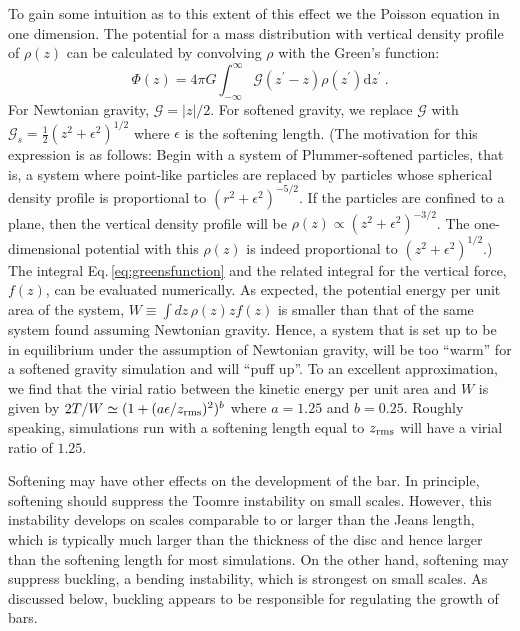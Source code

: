 To gain some intuition as to this extent of
this effect we the Poisson equation in one dimension.  The potential
for a mass distribution with vertical density profile of $\rho(z)$ can
be calculated by convolving $\rho$ with the Green's function:
\begin{equation}\label{eq:greensfunction}
\Phi(z)= 4\pi G\int_{-\infty}^{\infty} \mathcal{G}(z^\prime - z)
\rho(z^\prime) \text{d} z^\prime~.
\end{equation}
For Newtonian gravity, $\mathcal{G} = |z|/2$.  For softened gravity,
we replace $\mathcal{G}$ with $\mathcal{G}_s = \frac{1}{2}\left (z^2 +
\epsilon^2\right )^{1/2}$ where $\epsilon$ is the softening length.
(The motivation for this expression is as follows: Begin with a system
of Plummer-softened particles, that is, a system where point-like
particles are replaced by particles whose spherical density profile is
proportional to $\left (r^2 + \epsilon^2\right )^{-5/2}$.  If the
particles are confined to a plane, then the vertical density profile
will be $\rho(z)\propto \left (z^2 + \epsilon^2\right )^{-3/2}$.  The
one-dimensional potential with this $\rho(z)$ is indeed proportional
to $\left (z^2 + \epsilon^2\right )^{1/2}$.)  The integral
Eq.\,\ref{eq:greensfunction} and the related integral for the vertical
force, $f(z)$, can be evaluated numerically.  As expected, the
potential energy per unit area of the system, $W \equiv \int
dz\,\rho(z) z f(z)$ is smaller than that of the same system found
assuming Newtonian gravity.  Hence, a system that is set up to be in
equilibrium under the assumption of Newtonian gravity, will be too
``warm'' for a softened gravity simulation and will ``puff up''.  To
an excellent approximation, we find that the virial ratio between the
kinetic energy per unit area and $W$ is given by $2T/W \simeq (1 +
(a\epsilon/z_{\rm rms})^2)^{b}$ where $a = 1.25$ and $b = 0.25$.  Roughly
speaking, simulations run with a softening length equal to $z_{\rm rms}$
will have a virial ratio of $1.25$.

Softening may have other effects on the development of the bar.  In
principle, softening should suppress the Toomre instability on small
scales.  However, this instability develops on scales comparable to or
larger than the Jeans length, which is typically much larger than the
thickness of the disc and hence larger than the softening length for
most simulations.  On the other hand, softening may suppress buckling,
a bending instability, which is strongest on small scales.  As
discussed below, buckling appears to be responsible for regulating the
growth of bars.

